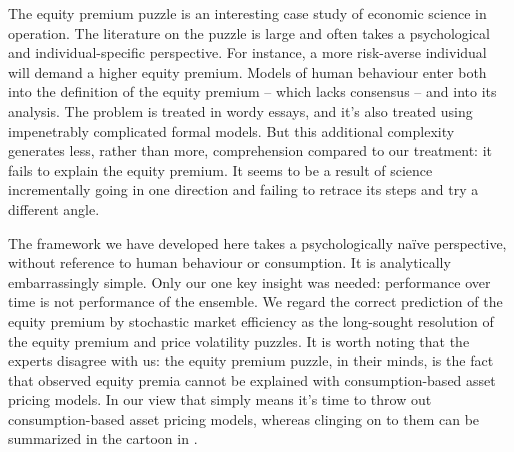 The equity premium puzzle is an interesting case study of economic science in operation. The literature on the puzzle is large and often takes a psychological and individual-specific perspective. For instance, a more risk-averse individual will demand a higher equity premium. Models of human behaviour enter both into the definition of the equity premium -- which lacks consensus \cite{Fernandez2009} -- and into its analysis. The problem is treated in wordy essays, and it's also treated using impenetrably complicated formal models. But this additional complexity generates less, rather than more, comprehension compared to our treatment: it fails to explain the equity premium. It seems to be a result of science incrementally going in one direction and failing to retrace its steps and try a different angle.

The framework we have developed here takes a psychologically na\"{i}ve perspective, without reference to human behaviour or consumption.
It is analytically embarrassingly simple. Only our one key insight was needed: performance over time is not performance of the ensemble. 
We regard the correct prediction of the equity premium by stochastic market efficiency as the long-sought resolution of the equity premium and price volatility puzzles. It is worth noting that the experts disagree with us: the equity premium puzzle, in their minds, is the fact that observed equity premia cannot be explained with consumption-based asset pricing models. In our view that simply means it's time to throw out consumption-based asset pricing models, whereas clinging on to them can be summarized in the cartoon in .
